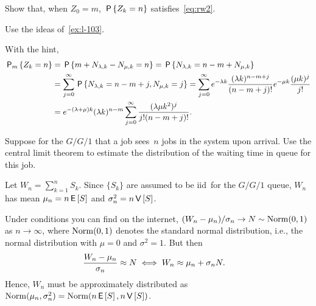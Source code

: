 \documentclass[stochastic-or.tex]{subfiles}
\begin{document}
\begin{exercise}\label{ex:l-134}
 Show that, when $Z_0=m$,  $\P{Z_k=n}$ satisfies~\cref{eq:rw2}.
 \begin{hint}
Use the ideas of~\cref{ex:l-103}.
 \end{hint}
\begin{solution}
With the hint,
\begin{align*}
 \PP{m}{Z_k=n}
&= \P{m+N_{\lambda, k } - N_{\mu, k} = n }
= \P{N_{\lambda, k} = n - m + N_{\mu, k}} \\
&= \sum_{j=0}^\infty \P{N_{\lambda, k}  =  n - m + j, N_{\mu, k} =j}
= \sum_{j=0}^\infty e^{-\lambda k} \frac{(\lambda k )^{n - m + j}}{(n-m+j)!} e^{-\mu k} \frac{(\mu k )^j}{j!} \\
&= e^{-(\lambda+\mu)k} (\lambda k)^{n-m} \sum_{j=0}^\infty  \frac{(\lambda\mu k^2)^j} {j!(n-m+j)!}.
\end{align*}
\end{solution}
\end{exercise}




\begin{exercise}\label{ex:l-147}
 Suppose
 for the $G/G/1$ that a job sees~$n$ jobs in the system upon arrival.
 Use the central limit theorem to estimate the distribution of the waiting time in queue for this job.
\begin{hint}
 Let $W_{n} = \sum_{k=1}^n S_k$.
 Since $\{S_k\}$ are assumed to be iid\ for the $G/G/1$ queue, $W_{n}$ has mean $\mu_n = n \E S$ and $\sigma_n^2 = n\V S$.
\end{hint}
\begin{solution} Under conditions you can find on the internet, $(W_{n} - \mu_n)/\sigma_n \to N \sim \Norm{0,1}$ as $n\to \infty$,
 where $\Norm{0,1}$ denotes the standard normal distribution, i.e., the normal distribution with $\mu=0$ and $\sigma^2=1$. But then
 \begin{align*}
 \frac{\W_{n} - \mu_n}{\sigma_n} &\approx N \iff  W_{n} \approx \mu_{n} + \sigma_n N.
 \end{align*}
Hence, $ W_{n}$ must be approximately distributed as $\Norm{\mu_n,\sigma_n^2} = \Norm{n\E S, n \V S}$.
\end{solution}
\end{exercise}




\end{document}

